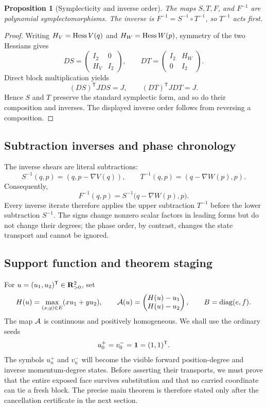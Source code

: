 \documentclass[11pt]{article}
\newtheorem{proposition}[theorem]{Proposition}
\theoremstyle{definition}
\theoremstyle{remark}
\begin{document}
\begin{proposition}[Symplecticity and inverse order]\label{prop:symplectic}
The maps \(S,T,F\), and \(F^{-1}\) are polynomial symplectomorphisms.  The
inverse is \(F^{-1}=S^{-1}\circ T^{-1}\), so \(T^{-1}\) acts first.
\end{proposition}

\begin{proof}
Writing \(H_V=\operatorname{Hess} V(q)\) and \(H_W=\operatorname{Hess} W(p)\), symmetry of the two
Hessians gives
\[
DS=\begin{pmatrix}I_2&0\\H_V&I_2\end{pmatrix},
\qquad
DT=\begin{pmatrix}I_2&H_W\\0&I_2\end{pmatrix}.
\]
Direct block multiplication yields
\[
(DS)^{\mathsf T}JDS=J,\qquad
(DT)^{\mathsf T}JDT=J.
\]
Hence \(S\) and \(T\) preserve the standard symplectic form, and so do
their composition and inverses.  The displayed inverse order follows from
reversing a composition.
\end{proof}

\subsection{Subtraction inverses and phase chronology}

The inverse shears are literal subtractions:
\[
S^{-1}(q,p)=(q,p-\nabla V(q)),\qquad
T^{-1}(q,p)=(q-\nabla W(p),p).
\]
Consequently,
\[
F^{-1}(q,p)
=S^{-1}\bigl(q-\nabla W(p),p\bigr).
\]
Every inverse iterate therefore applies the upper subtraction
\(T^{-1}\) before the lower subtraction \(S^{-1}\).  The signs change
nonzero scalar factors in leading forms but do not change their degrees;
the phase order, by contrast, changes the state transport and cannot be
ignored.

\subsection{Support function and theorem staging}

For \(u=(u_1,u_2)^{\mathsf T}\in\mathbf{R}_{>0}^2\), set
\[
H(u)=\max_{(x,y)\in E}(xu_1+yu_2),\qquad
\mathcal{A}(u)=
\begin{pmatrix}H(u)-u_1\\H(u)-u_2\end{pmatrix},
\qquad
B=\operatorname{diag}(e,f).
\]
The map \(\mathcal{A}\) is continuous and positively homogeneous.  We shall use
the ordinary seeds
\[
u^+_0=v^-_0=\mathbf{1}=(1,1)^{\mathsf T}.
\]
The symbols \(u_n^+\) and \(v_n^-\) will become the visible forward
position-degree and inverse momentum-degree states.  Before asserting
their transports, we must prove that the entire exposed face survives
substitution and that no carried coordinate can tie a fresh block.  The
precise main theorem is therefore stated only after the cancellation
certificate in the next section.
\end{document}
